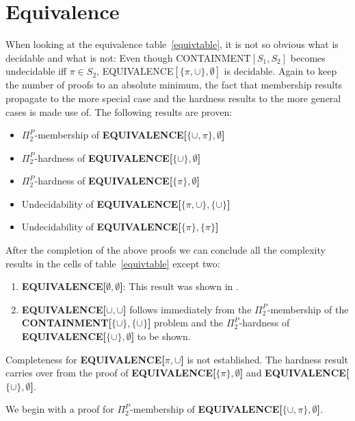 \section{Equivalence}
When looking at the equivalence table~\ref{equivtable}, it is not so obvious
what is decidable and what is not: Even though CONTAINMENT$[S_1,S_2]$ becomes
undecidable iff $\pi \in S_2$, EQUIVALENCE$[\{\pi,\cup\},\emptyset]$
is decidable. Again to keep the number of proofs to an absolute minimum, the
fact that membership results propagate to the more special case and the hardness
results to the more general cases is made use of.
The following results are proven:
\begin{itemize}
	\item $\Pi^P_2$-membership of \textbf{EQUIVALENCE[$\{\cup,\pi\},\emptyset$]}
	\item $\Pi^P_2$-hardness of \textbf{EQUIVALENCE[$\{\cup\},\emptyset$]}
	\item $\Pi^P_2$-hardness of \textbf{EQUIVALENCE[$\{\pi\},\emptyset$]}
	\item Undecidability of \textbf{EQUIVALENCE[$\{\pi,\cup \},\{\cup \}$]}
	\item Undecidability of \textbf{EQUIVALENCE[$\{\pi\},\{\pi\}$]}
\end{itemize}

After the completion of the above proofs we can conclude all the complexity results in the cells of table~\ref{equivtable}
except two:
\begin{enumerate}
	\item \textbf{EQUIVALENCE[$\emptyset,\emptyset$]}: This result was shown in
\cite{letelier2012static}. 
\item \textbf{EQUIVALENCE[$\cup,\cup$]} follows immediately from the $\Pi^P_2$-membership
	of the \textbf{CONTAINMENT[$\{\cup\}, \{\cup\}$]} problem and the $\Pi^P_2$-hardness of
	\textbf{EQUIVALENCE[$\{\cup\}, \emptyset$]} to be shown.
\end{enumerate}
Completeness for \textbf{EQUIVALENCE[$\pi,\cup$]} is not established. The hardness result
carries over from the proof of \textbf{EQUIVALENCE[$\{\pi\},\emptyset$]} and
\textbf{EQUIVALENCE[$\{\cup\},\emptyset$]}.

We begin with a proof for $\Pi^P_2$-membership of
\textbf{EQUIVALENCE[$\{\cup,\pi\},\emptyset$]}. 

